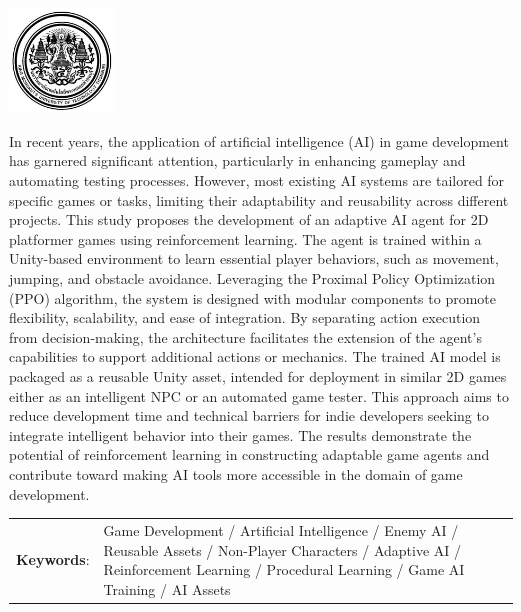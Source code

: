 \documentclass[12pt,oneside,openright,a4paper]{cpe-english-project}
\begin{document}
\pdfstringdefDisableCommands{%
\let\MakeUppercase\relax
}
\begin{center}
  \includegraphics[width=2.8cm]{logo02.jpg}
\end{center}
\vspace*{-1cm}

\maketitlepage
\makesignaturepage 

\abstract

In recent years, the application of artificial intelligence (AI) in game development has garnered significant attention, particularly in enhancing gameplay and automating testing processes. However, most existing AI systems are tailored for specific games or tasks, limiting their adaptability and reusability across different projects. This study proposes the development of an adaptive AI agent for 2D platformer games using reinforcement learning. The agent is trained within a Unity-based environment to learn essential player behaviors, such as movement, jumping, and obstacle avoidance. Leveraging the Proximal Policy Optimization (PPO) algorithm, the system is designed with modular components to promote flexibility, scalability, and ease of integration. By separating action execution from decision-making, the architecture facilitates the extension of the agent’s capabilities to support additional actions or mechanics. The trained AI model is packaged as a reusable Unity asset, intended for deployment in similar 2D games either as an intelligent NPC or an automated game tester. This approach aims to reduce development time and technical barriers for indie developers seeking to integrate intelligent behavior into their games. The results demonstrate the potential of reinforcement learning in constructing adaptable game agents and contribute toward making AI tools more accessible in the domain of game development.


\begin{flushleft}
\begin{tabular*}{\textwidth}{@{}lp{}}
\textbf{Keywords}: & Game Development / Artificial Intelligence / Enemy AI / Reusable Assets / Non-Player Characters / Adaptive AI / Reinforcement Learning / Procedural Learning / Game AI Training / AI Assets
\end{tabular*}
\end{flushleft}
\endabstract
\end{document}
